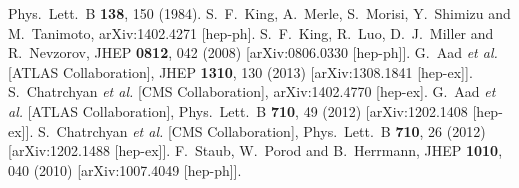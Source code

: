 \documentclass[final,3p,11pt,pdflatex]{elsarticle}
\begin{document}
\begin{thebibliography}{100}
  Phys.\ Lett.\ B {\bf 138}, 150 (1984).
  S.~F.~King, A.~Merle, S.~Morisi, Y.~Shimizu and M.~Tanimoto,
  arXiv:1402.4271 [hep-ph].
  S.~F.~King, R.~Luo, D.~J.~Miller and R.~Nevzorov,
  JHEP {\bf 0812}, 042 (2008)
  [arXiv:0806.0330 [hep-ph]].
  G.~Aad {\it et al.}  [ATLAS Collaboration],
  JHEP {\bf 1310}, 130 (2013)
  [arXiv:1308.1841 [hep-ex]].
  S.~Chatrchyan {\it et al.}  [CMS Collaboration],
  arXiv:1402.4770 [hep-ex].
  G.~Aad {\it et al.}  [ATLAS Collaboration],
  Phys.\ Lett.\ B {\bf 710}, 49 (2012)
  [arXiv:1202.1408 [hep-ex]].
  S.~Chatrchyan {\it et al.}  [CMS Collaboration],
  Phys.\ Lett.\ B {\bf 710}, 26 (2012)
  [arXiv:1202.1488 [hep-ex]].
  F.~Staub, W.~Porod and B.~Herrmann,
  JHEP {\bf 1010}, 040 (2010)
  [arXiv:1007.4049 [hep-ph]].


\end{thebibliography}
\end{document}
